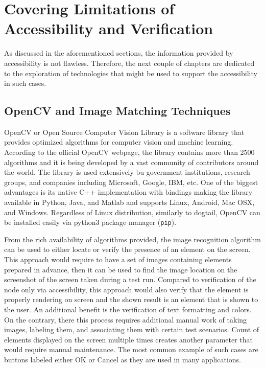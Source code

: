 \section{Covering Limitations of Accessibility and Verification}
As discussed in the aforementioned sections, the information provided by accessibility is not flawless. Therefore, the next couple of chapters are dedicated to the exploration of technologies that might be used to support the accessibility in such cases.

\subsection{OpenCV and Image Matching Techniques}
OpenCV or Open Source Computer Vision Library is a software library that provides optimized algorithms for computer vision and machine learning. According to the official OpenCV webpage\cite{opencv}, the library contains more than 2500 algorithms and it is being developed 
by a vast community of contributors around the world. The library is used extensively bu government institutions, research groups, and companies including Microsoft, Google, IBM, etc. One of the biggest advantages is its native C++ implementation with bindings making the library available in Python, Java, and Matlab and supports Linux, Android, Mac OSX, and Windows. Regardless of Linux distribution, similarly to dogtail, OpenCV can be installed easily via python3 package manager (\texttt{pip}). 

From the rich availability of algorithms provided, the image recognition algorithm can be used to either locate or verify the presence of an element on the screen. This approach would require to have a set of images containing elements prepared in advance, then it can be used to find the image location on the screenshot of the screen taken during a test run. Compared to verification of the node only via accessibility, this approach would also verify that the element is properly rendering on screen and the shown result is an element that is shown to the user. An additional benefit is the verification of text formatting and colors. On the contrary, there this process requires additional manual work of taking images, labeling them, and associating them with certain test scenarios. Count of elements displayed on the screen multiple times creates another parameter that would require manual maintenance. The most common example of such cases are buttons labeled either OK or Cancel as they are used in many applications.

